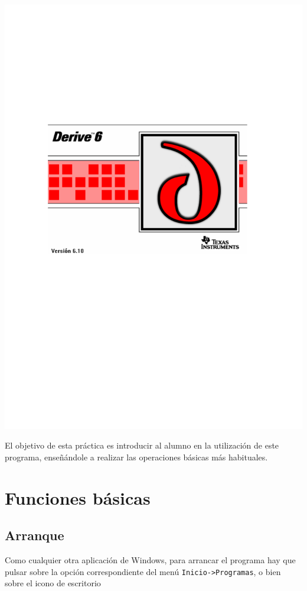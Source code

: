 \begin{center}
  \includegraphics[scale=0.6]{img/introduccion_derive/introduccion}
\end{center}


El objetivo de esta práctica es introducir al alumno en la
utilización de este programa, enseñándole a realizar las operaciones
básicas más habituales.


\section{Funciones básicas}
\subsection*{Arranque}
Como cualquier otra aplicación de Windows, para arrancar el programa
hay que pulsar sobre la opción correspondiente del menú
\texttt{Inicio->Programas}, o bien sobre el icono de escritorio


